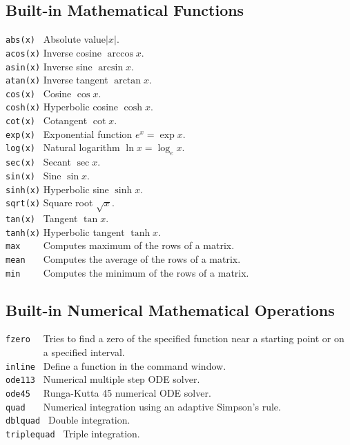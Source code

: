 \subsection*{Built-in Mathematical Functions}
\verb&abs(x) & Absolute value$|x|$.\\
\verb&acos(x)& Inverse cosine $\arccos{x}$.\\
\verb&asin(x)& Inverse sine $\arcsin{x}$.\\
\verb&atan(x)& Inverse tangent $\arctan{x}$.\\
\verb&cos(x) & Cosine $\cos{x}$.\\
\verb&cosh(x)& Hyperbolic cosine $\cosh{x}$.\\
\verb&cot(x) & Cotangent $\cot{x}$.\\
\verb&exp(x) & Exponential function $e^x = \exp{x}.$\\
\verb&log(x) & Natural logarithm $\ln{x} = \log_e{x}$.\\
\verb&sec(x) & Secant $\sec{x}$.\\
\verb&sin(x) & Sine $\sin{x}$.\\
\verb&sinh(x)& Hyperbolic sine $\sinh{x}$.\\
\verb&sqrt(x)& Square root $\sqrt{x}$.\\
\verb&tan(x) & Tangent $\tan{x}$.\\
\verb&tanh(x)& Hyperbolic tangent $\tanh{x}$.\\
\verb&max    & Computes maximum of the rows of a matrix.\\
\verb&mean   & Computes the average of the rows of a matrix. \\
\verb&min    & Computes the minimum of the rows of a matrix.


\subsection*{Built-in Numerical Mathematical Operations}
\verb&fzero  & Tries to find a zero of the specified function near a starting point
                or on\\
\verb&       & a specified interval.\\
\verb&inline & Define a function in the command window.\\
\verb&ode113 & Numerical multiple step ODE solver.\\
\verb&ode45  & Runga-Kutta 45 numerical ODE solver.\\
\verb&quad   & Numerical integration using an adaptive Simpson's rule.\\
\verb&dblquad & Double integration.\\
\verb&triplequad & Triple integration.





